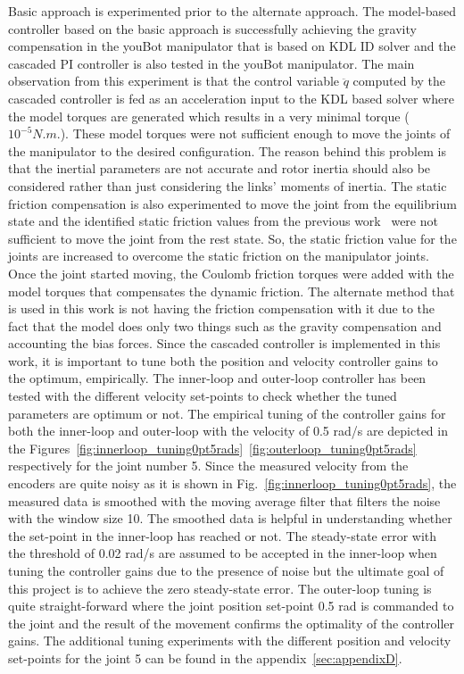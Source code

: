 Basic approach is experimented prior to the alternate approach. The model-based controller based on the basic approach is successfully achieving the gravity compensation in the youBot manipulator that is based on KDL ID solver and the cascaded PI controller is also tested in the youBot manipulator. The main observation from this experiment is that the control variable $\ddot{q}$ computed by the cascaded controller is fed as an acceleration input to the KDL based solver where the model torques are generated which results in a very minimal torque ($10^{-5} N.m.$). These model torques were not sufficient enough to move the joints of the manipulator to the desired configuration. The reason behind this problem is that the inertial parameters are not accurate and rotor inertia should also be considered rather than just considering the links' moments of inertia. The static friction compensation is also experimented to move the joint from the equilibrium state and the identified static friction values from the previous work~\cite{RnD2Rajagopal} were not sufficient to move the joint from the rest state. So, the static friction value for the joints are increased to overcome the static friction on the manipulator joints. Once the joint started moving, the Coulomb friction torques were added with the model torques that compensates the dynamic friction. The alternate method that is used in this work is not having the friction compensation with it due to the fact that the model does only two things such as the gravity compensation and accounting the bias forces. Since the cascaded controller is implemented in this work, it is important to tune both the position and velocity controller gains to the optimum, empirically. The inner-loop and outer-loop controller has been tested with the different velocity set-points to check whether the tuned parameters are optimum or not. The empirical tuning of the controller gains for both the inner-loop and outer-loop with the velocity of 0.5 rad/s are depicted in the Figures~\ref{fig:innerloop_tuning0pt5rads}~\ref{fig:outerloop_tuning0pt5rads} respectively for the joint number 5. Since the measured velocity from the encoders are quite noisy as it is shown in Fig.~\ref{fig:innerloop_tuning0pt5rads}, the measured data is smoothed with the moving average filter that filters the noise with the window size 10. The smoothed data is helpful in understanding whether the set-point in the inner-loop has reached or not. The steady-state error with the threshold of 0.02 rad/s are assumed to be accepted in the inner-loop when tuning the controller gains due to the presence of noise but the ultimate goal of this project is to achieve the zero steady-state error. The outer-loop tuning is quite straight-forward where the joint  position set-point 0.5 rad is commanded to the joint and the result of the movement confirms the optimality of the controller gains. The additional tuning experiments with the different position and velocity set-points for the joint 5 can be found in the appendix~\ref{sec:appendixD}. 

